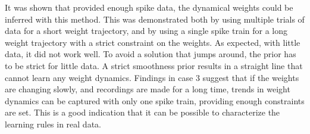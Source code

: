 It was shown that provided enough spike data, the dynamical weights could be inferred with this method. This was demonstrated both by using multiple trials of data for a short weight trajectory, and by using a single spike train for a long weight trajectory with a strict constraint on the weights. As expected, with little data, it did not work well. To avoid a solution that jumps around, the prior has to be strict for little data. A strict smoothness prior results in a straight line that cannot learn any weight dynamics. Findings in case 3 suggest that if the weights are changing slowly, and recordings are made for a long time, trends in weight dynamics can be captured with only one spike train, providing enough constraints are set. This is a good indication that it can be possible to characterize the learning rules in real data. 






\cleardoublepage